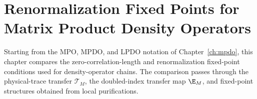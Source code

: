 
\chapter{Renormalization Fixed Points for Matrix Product Density Operators}\label{ch:mpdo_rfp}

Starting from the MPO, MPDO, and LPDO notation of Chapter~\ref{ch:mpdo},
this chapter compares the zero-correlation-length and renormalization
fixed-point conditions used for density-operator chains. The comparison passes
through the physical-trace transfer $\mathcal T_M$, the doubled-index transfer
map $\E_M$, and fixed-point structures obtained from local purifications.









